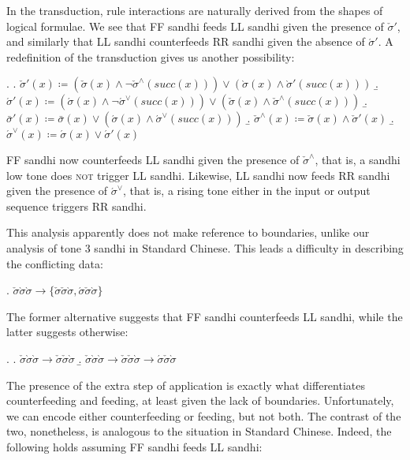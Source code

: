 \documentclass[12pt, a4paper]{report}
\newcommand{\textemph}[1]{\textsc{#1}}
\begin{document}
In the transduction, rule interactions are naturally derived from the
shapes of logical formulae.  We see that FF sandhi feeds LL sandhi
given the presence of \(\check{\sigma}'\), and similarly that LL
sandhi counterfeeds RR sandhi given the absence of
\(\acute{\sigma}'\).  A redefinition of the transduction gives us
another possibility:

\ex.
\a. \(\check{\sigma}'(x) \coloneq
(\check{\sigma}(x) \land
\neg\check{\sigma}^{\land}(\mathit{succ}(x))) \lor
(\grave{\sigma}(x) \land \grave{\sigma}'(\mathit{succ}(x)))\)
\b. \(\acute{\sigma}'(x) \coloneq
(\acute{\sigma}(x) \land
\neg\acute{\sigma}^{\lor}(\mathit{succ}(x))) \lor
(\check{\sigma}(x) \land \check{\sigma}^{\land}(\mathit{succ}(x)))\)
\b. \(\bar{\sigma}'(x) \coloneq \bar{\sigma}(x) \lor
(\acute{\sigma}(x) \land
\acute{\sigma}^{\lor}(\mathit{succ}(x)))\)
\b. \(\check{\sigma}^{\land}(x) \coloneq
\check{\sigma}(x) \land \check{\sigma}'(x)\)
\b. \(\acute{\sigma}^{\lor}(x) \coloneq
\acute{\sigma}(x) \lor \acute{\sigma}'(x)\)

FF sandhi now counterfeeds LL sandhi given the presence of
\(\check{\sigma}^{\land}\), that is, a sandhi low tone does
\textemph{not} trigger LL sandhi.  Likewise, LL sandhi now feeds RR
sandhi given the presence of \(\acute{\sigma}^{\lor}\), that is, a
rising tone either in the input or output sequence triggers RR sandhi.


This analysis apparently does not make reference to boundaries, unlike
our analysis of tone 3 sandhi in Standard Chinese.  This leads a
difficulty in describing the conflicting data:

\ex. \(\check{\sigma}\grave{\sigma}\grave{\sigma} \to
\{\check{\sigma}\check{\sigma}\grave{\sigma},
\acute{\sigma}\check{\sigma}\grave{\sigma}\}\)

The former alternative suggests that FF sandhi counterfeeds LL sandhi,
while the latter suggests otherwise:

\ex.
\a. \(\check{\sigma}\grave{\sigma}\grave{\sigma} \to
\check{\sigma}\check{\sigma}\grave{\sigma}\)
\b. \(\check{\sigma}\grave{\sigma}\grave{\sigma} \to
\check{\sigma}\check{\sigma}\grave{\sigma} \to
\acute{\sigma}\check{\sigma}\grave{\sigma}\)

The presence of the extra step of application is exactly what
differentiates counterfeeding and feeding, at least given the lack of
boundaries.  Unfortunately, we can encode either counterfeeding or
feeding, but not both.  The contrast of the two, nonetheless, is
analogous to the situation in Standard Chinese.  Indeed, the following
holds assuming FF sandhi feeds LL sandhi:
\end{document}
